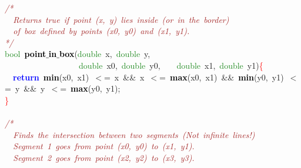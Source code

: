 {\ttfamily \raggedright {
\noindent
\mbox{}\textit{\textcolor{Brown}{/*}} \\
\mbox{}\textit{\textcolor{Brown}{\ \ Returns\ true\ if\ point\ (x,\ y)\ lies\ inside\ (or\ in\ the\ border)}} \\
\mbox{}\textit{\textcolor{Brown}{\ \ of\ box\ defined\ by\ points\ (x0,\ y0)\ and\ (x1,\ y1).}} \\
\mbox{}\textit{\textcolor{Brown}{*/}} \\
\mbox{}\textcolor{ForestGreen}{bool}\ \textbf{\textcolor{Black}{point$\_$in$\_$box}}\textcolor{BrickRed}{(}\textcolor{ForestGreen}{double}\ x\textcolor{BrickRed}{,}\ \textcolor{ForestGreen}{double}\ y\textcolor{BrickRed}{,} \\
\mbox{}\ \ \ \ \ \ \ \ \ \ \ \ \ \ \ \ \ \ \textcolor{ForestGreen}{double}\ x0\textcolor{BrickRed}{,}\ \textcolor{ForestGreen}{double}\ y0\textcolor{BrickRed}{,}\ \ \ \ \textcolor{ForestGreen}{double}\ x1\textcolor{BrickRed}{,}\ \textcolor{ForestGreen}{double}\ y1\textcolor{BrickRed}{)}\textcolor{Red}{\{} \\
\mbox{}\ \ \textbf{\textcolor{Blue}{return}}\ \textbf{\textcolor{Black}{min}}\textcolor{BrickRed}{(}x0\textcolor{BrickRed}{,}\ x1\textcolor{BrickRed}{)}\ \textcolor{BrickRed}{$<$=}\ x\ \textcolor{BrickRed}{\&\&}\ x\ \textcolor{BrickRed}{$<$=}\ \textbf{\textcolor{Black}{max}}\textcolor{BrickRed}{(}x0\textcolor{BrickRed}{,}\ x1\textcolor{BrickRed}{)}\ \textcolor{BrickRed}{\&\&}\ \textbf{\textcolor{Black}{min}}\textcolor{BrickRed}{(}y0\textcolor{BrickRed}{,}\ y1\textcolor{BrickRed}{)}\ \textcolor{BrickRed}{$<$=}\ y\ \textcolor{BrickRed}{\&\&}\ y\ \textcolor{BrickRed}{$<$=}\ \textbf{\textcolor{Black}{max}}\textcolor{BrickRed}{(}y0\textcolor{BrickRed}{,}\ y1\textcolor{BrickRed}{);} \\
\mbox{}\textcolor{Red}{\}} \\
\mbox{} \\
\mbox{}\textit{\textcolor{Brown}{/*}} \\
\mbox{}\textit{\textcolor{Brown}{\ \ Finds\ the\ intersection\ between\ two\ segments\ (Not\ infinite\ lines!)}} \\
\mbox{}\textit{\textcolor{Brown}{\ \ Segment\ 1\ goes\ from\ point\ (x0,\ y0)\ to\ (x1,\ y1).}} \\
\mbox{}\textit{\textcolor{Brown}{\ \ Segment\ 2\ goes\ from\ point\ (x2,\ y2)\ to\ (x3,\ y3).}} \\
\mbox{} \\
}}

